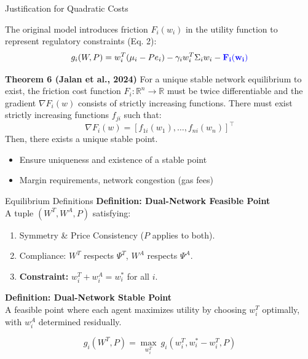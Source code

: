 \documentclass[aspectratio=169]{beamer}
\begin{document}
\begin{frame}{Justification for Quadratic Costs}

    The original model introduces friction $F_i(w_i)$ in the utility function to represent regulatory constraints (Eq. 2):
    \begin{equation}
         g_i(W,P) = w_i^T(\mu_i - Pe_i) - \gamma_i w_i^T \Sigma_i w_i - \textcolor{blue}{\mathbf{F_i(w_i)}}
    \end{equation}
        
    
    \begin{block}{\textbf{Theorem 6 (Jalan et al., 2024)}}
        For a unique stable network equilibrium to exist, the friction cost function $F_i: \mathbb{R}^n \to \mathbb{R}$ must be  twice differentiable and the gradient $\nabla F_i(w)$ consists of strictly increasing functions.
        There must exist strictly increasing functions $f_{ji}$ such that:
        $$ \nabla F_i(w) = [f_{1i}(w_1), \dots, f_{ni}(w_n)]^\top $$
        Then, there exists a unique stable point.
    \end{block}
    

    \begin{itemize}
        \item Ensure uniqueness and existence of a stable point
        \item Margin requirements, network congestion (gas fees)
    \end{itemize}

\end{frame}



\begin{frame}{Equilibrium Definitions}
    \textbf{Definition: Dual-Network Feasible Point} \\
    A tuple $(W^T, W^A, P)$ satisfying:
    \begin{enumerate}
        \item Symmetry \& Price Consistency ($P$ applies to both).
        \item Compliance: $W^T$ respects $\Psi^T$, $W^A$ respects $\Psi^A$.
        \item \textbf{Constraint:} $w_i^T + w_i^A = w_i^*$ for all $i$.
    \end{enumerate}
    
    \vspace{0.4cm}
    
    \textbf{Definition: Dual-Network Stable Point} \\
    A feasible point where each agent maximizes utility by choosing $w_i^T$ optimally, with $w_i^A$ determined residually.
    
    \begin{equation}
        g_i(W^T, P) = \max_{w_i^T} \ g_i(w_i^T, w_i^* - w_i^T, P)
    \end{equation}
\end{frame}
\end{document}

